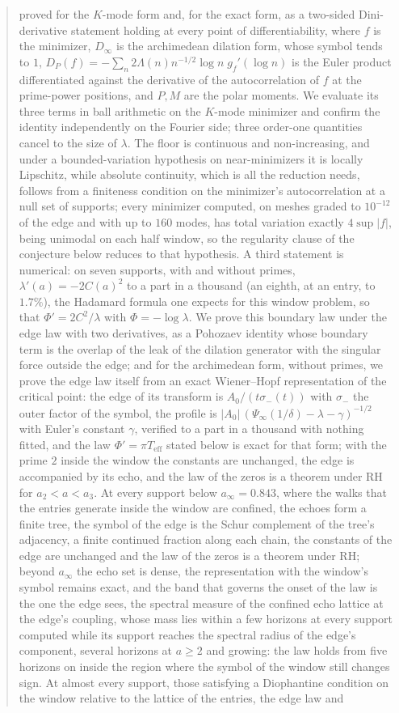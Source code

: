 \documentclass[11pt]{article}
\theoremstyle{definition}
\theoremstyle{remark}
\begin{document}
\begin{abstract}
proved for the $K$-mode form and, for the exact form, as a two-sided Dini-derivative statement holding at every point of differentiability, where $f$ is the minimizer, $D_\infty$ is the archimedean dilation form, whose symbol tends to $1$, $D_P(f)=-\sum_n 2\Lambda(n)n^{-1/2}\log n\; g_f'(\log n)$ is the Euler product differentiated against the derivative of the autocorrelation of $f$ at the prime-power positions, and $P,M$ are the polar moments. We evaluate its three terms in ball arithmetic on the $K$-mode minimizer and confirm the identity independently on the Fourier side; three order-one quantities cancel to the size of $\lambda$. The floor is continuous and non-increasing, and under a bounded-variation hypothesis on near-minimizers it is locally Lipschitz, while absolute continuity, which is all the reduction needs, follows from a finiteness condition on the minimizer's autocorrelation at a null set of supports; every minimizer computed, on meshes graded to $10^{-12}$ of the edge and with up to $160$ modes, has total variation exactly $4\sup|f|$, being unimodal on each half window, so the regularity clause of the conjecture below reduces to that hypothesis. A third statement is numerical: on seven supports, with and without primes, $\lambda'(a)=-2C(a)^2$ to a part in a thousand (an eighth, at an entry, to $1.7\%$), the Hadamard formula one expects for this window problem, so that $\Phi'=2C^2/\lambda$ with $\Phi=-\log\lambda$. We prove this boundary law under the edge law with two derivatives, as a Pohozaev identity whose boundary term is the overlap of the leak of the dilation generator with the singular force outside the edge; and for the archimedean form, without primes, we prove the edge law itself from an exact Wiener--Hopf representation of the critical point: the edge of its transform is $A_0/(t\sigma_-(t))$ with $\sigma_-$ the outer factor of the symbol, the profile is $|A_0|\,(\Psi_\infty(1/\delta)-\lambda-\gamma)^{-1/2}$ with Euler's constant $\gamma$, verified to a part in a thousand with nothing fitted, and the law $\Phi'=\pi T_{\mathrm{eff}}$ stated below is exact for that form; with the prime $2$ inside the window the constants are unchanged, the edge is accompanied by its echo, and the law of the zeros is a theorem under RH for $a_2<a<a_3$. At every support below $a_\infty=0.843$, where the walks that the entries generate inside the window are confined, the echoes form a finite tree, the symbol of the edge is the Schur complement of the tree's adjacency, a finite continued fraction along each chain, the constants of the edge are unchanged and the law of the zeros is a theorem under RH; beyond $a_\infty$ the echo set is dense, the representation with the window's symbol remains exact, and the band that governs the onset of the law is the one the edge sees, the spectral measure of the confined echo lattice at the edge's coupling, whose mass lies within a few horizons at every support computed while its support reaches the spectral radius of the edge's component, several horizons at $a\ge2$ and growing: the law holds from five horizons on inside the region where the symbol of the window still changes sign. At almost every support, those satisfying a Diophantine condition on the window relative to the lattice of the entries, the edge law and 
\end{abstract}
\end{document}
